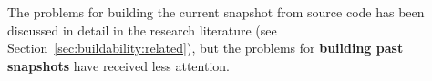 



The problems for building the current snapshot from source code has been discussed in detail in the research literature (see Section~\ref{sec:buildability:related}), but the problems for \textbf{building past snapshots} have received less attention. 

